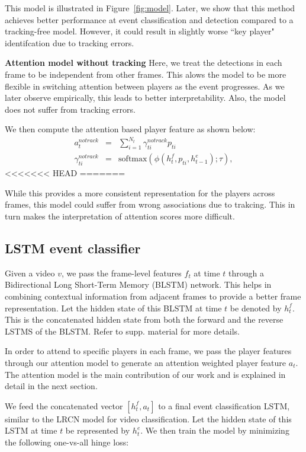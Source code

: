 {{This model is illustrated in Figure~\ref{fig:model}.
Later, we show that this method achieves better
performance at event classification and detection compared to a
tracking-free model. However, it could result in slightly worse ``key player"
identifcation due to tracking errors.

\noindent \textbf{Attention model without tracking}
Here, we treat the detections in each frame to be independent from other
frames.  This alows the model to be more flexible in switching attention
between players as the event progresses.  As we later observe empirically, this
leads to better interpretability.  Also, the model does not suffer from
tracking errors.

We then compute the attention based player feature as shown below:
\begin{eqnarray} 
\label{eq:notrack}
  a_t^{notrack} & = & \sum_{i=1}^{N_t} \gamma_{ti}^{notrack} p_{ti} 
\\ \nonumber
  \gamma_{ti}^{notrack} & = & \text{softmax} \left(\phi\left(h^f_t, p_{ti}, h^e_{t-1}\right); \tau\right),
\end{eqnarray}
<<<<<<< HEAD
=======

While this provides a more consistent representation for the players across frames,
this model could suffer from wrong associations due to trakcing. This in turn makes
the interpretation of attention scores more difficult.


\subsection{LSTM event classifier}
Given a video $v$, we pass the frame-level features $f_t$ at time $t$ through a
Bidirectional Long Short-Term Memory (BLSTM) network. This helps in combining
contextual information from adjacent frames to provide a better frame
representation.  Let the hidden state of this BLSTM at time $t$ be denoted by
$h^f_t$.  This is the concatenated hidden state from both the forward and the
reverse LSTMS of the BLSTM. Refer to supp.  material for more details.

In order to attend to specific players in each frame, we pass the player features
through our attention model to generate an attention weighted player feature
$a_t$. The attention model is the main contribution of our work
and is explained in detail in the next section.

We feed the concatenated vector $[h^f_t, a_t]$ to a final event classification
LSTM, similar to the LRCN \cite{} model for video classification. Let
the hidden state of this LSTM at time $t$ be represented by $h^e_t$.  We then
train the model by minimizing the following one-vs-all hinge loss:

}}
